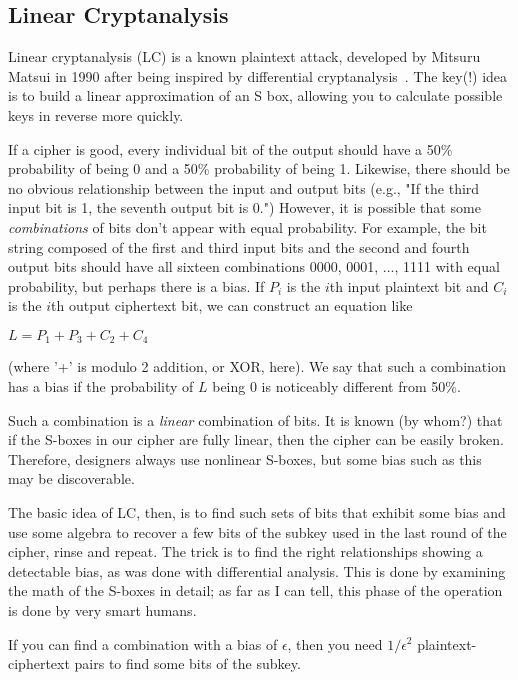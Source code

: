 \documentclass[%
 aip,
 jmp,%
 amsmath,amssymb,
 reprint,%
]{revtex4-1}
\begin{document}
\subsection{Linear Cryptanalysis}

Linear cryptanalysis (LC) is a known plaintext attack, developed by
Mitsuru Matsui in 1990 after being inspired by differential
cryptanalysis~\cite{matsui1993linear}.  The key(!)  idea is to build a
linear approximation of an S box, allowing you to calculate possible
keys in reverse more quickly.

If a cipher is good, every individual bit of the output should have a
50\% probability of being 0 and a 50\% probability of being 1.
Likewise, there should be no obvious relationship between the input
and output bits (e.g., "If the third input bit is 1, the seventh
output bit is 0.")  However, it is possible that some \emph{combinations}
of bits don't appear with equal probability. For example, the bit
string composed of the first and third input bits and the second and
fourth output bits should have all sixteen combinations 0000, 0001,
..., 1111 with equal probability, but perhaps there is a bias.  If $P_i$
is the $i$th input plaintext bit and $C_i$ is the $i$th output ciphertext
bit, we can construct an equation like

$L = P_1 + P_3 + C_2 + C_4$

(where '+' is modulo 2 addition, or XOR, here).  We say that such a
combination has a bias if the probability of $L$ being 0 is noticeably
different from 50\%.

Such a combination is a \emph{linear} combination of bits.  It is known (by
whom?) that if the S-boxes in our cipher are fully linear, then the
cipher can be easily broken.  Therefore, designers always use
nonlinear S-boxes, but some bias such as this may be discoverable.

The basic idea of LC, then, is to find such sets of bits that exhibit
some bias and use some algebra to recover a few bits of the subkey
used in the last round of the cipher, rinse and repeat.  The trick is
to find the right relationships showing a detectable bias, as was done
with differential analysis.  This is done by examining the math of the
S-boxes in detail; as far as I can tell, this phase of the operation
is done by very smart humans.

If you can find a combination with a bias of $\epsilon$, then you need
$1/\epsilon^2$ plaintext-ciphertext pairs to find some bits of the
subkey.
\end{document}
